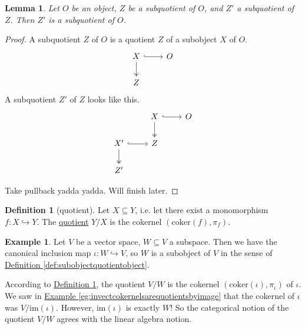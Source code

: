 \documentclass[a4paper,10pt]{scrreprt}
\newcommand{\defn}[1]{\ul{#1}}
\newcommand{\coker}{\mathrm{coker}}
\newcommand{\im}{\mathrm{im}}
\theoremstyle{definition}
\newtheorem{definition}{Definition}[section]
\newtheorem{example}{Example}[section]
\theoremstyle{plain}
\newtheorem{lemma}{Lemma}[section]
\theoremstyle{remark}
\begin{document}
\begin{lemma}
  Let $O$ be an object, $Z$ be a subquotient of $O$, and $Z'$ a subquotient of $Z$. Then $Z'$ is a subquotient of $O$.
\end{lemma}
\begin{proof}
  A subquotient $Z$ of $O$ is a quotient $Z$ of a subobject $X$ of $O$.
  \begin{equation*}
    \begin{tikzcd}
      X 
      \arrow[r, hookrightarrow]
      \arrow[d, twoheadrightarrow]
      & O
      \\
      Z
    \end{tikzcd}
  \end{equation*}
  A subquotient $Z'$ of $Z$ looks like this.
  \begin{equation*}
    \begin{tikzcd}
      & X
      \arrow[r, hookrightarrow]
      \arrow[d, twoheadrightarrow]
      & O
      \\
      X'
      \arrow[r, hookrightarrow]
      \arrow[d, twoheadrightarrow]
      & Z
      \\
      Z'
    \end{tikzcd}
  \end{equation*}

  Take pullback yadda yadda. Will finish later.
\end{proof}

\begin{definition}[quotient]
  \label{def:quotient}
  Let $X \subseteq Y$, i.e. let there exist a monomorphism $f\colon X \hookrightarrow Y$. The \defn{quotient} $Y/X$ is the cokernel $(\coker(f), \pi_{f})$.
\end{definition}

\begin{example}
  Let $V$ be a vector space, $W \subseteq V$ a subspace. Then we have the canonical inclusion map $\iota\colon W \hookrightarrow V$, so $W$ is a subobject of $V$ in the sense of \hyperref[def:subobjectquotientobject]{Definition \ref*{def:subobjectquotientobject}}.

  According to \hyperref[def:quotient]{Definition \ref*{def:quotient}}, the quotient $V / W$ is the cokernel $(\coker(\iota), \pi_{\iota})$ of $\iota$. We saw in \hyperref[eg:invectcokernelsarequotientsbyimage]{Example \ref*{eg:invectcokernelsarequotientsbyimage}} that the cokernel of $\iota$ was $V / \im(\iota)$. However, $\im(\iota)$ is exactly $W$! So the categorical notion of the quotient $V / W$ agrees with the linear algebra notion.
\end{example}
\end{document}
